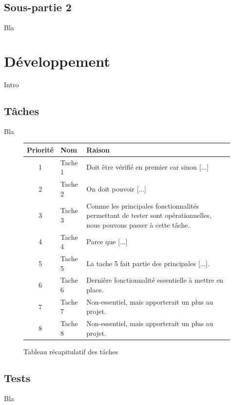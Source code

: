 \subsection{Sous-partie 2}

Bla

\newpage

\section{Développement}

Intro

\subsection{Tâches}

Bla\\


\begin{figure}[!h]
\begin{center}
\begin{tabularx}{17cm}{|c|p{6cm}|X|}
  \hline
  Priorité & Nom & Raison\\
  \hline
  1 & Tache 1 & Doit être vérifié en premier car sinon [...] \tabularnewline
  2 & Tache 2 & On doit pouvoir [...] \tabularnewline
  3 & Tache 3 & Comme les principales fonctionnalités permettant de tester sont opérationnelles, nous pouvons passer à cette tâche. \tabularnewline
  4 & Tache 4 & Parce que [...] \tabularnewline
  5 & Tache 5 & La tache 5 fait partie des principales [...]. \tabularnewline
  6 & Tache 6 & Dernière fonctionnalité essentielle à mettre en place. \tabularnewline
  7 & Tache 7 & Non-essentiel, mais apporterait un plus au projet. \tabularnewline
  8 & Tache 8 & Non-essentiel, mais apporterait un plus au projet. \tabularnewline
  \hline
\end{tabularx}
\end{center}
\caption{Tableau récapitulatif des tâches}
\end{figure}

\subsection{Tests}

Bla\\

